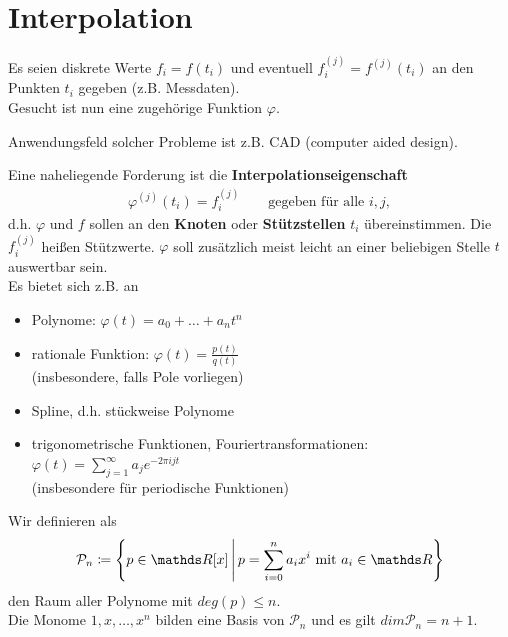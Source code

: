 %
%
%
%


\chapter{Interpolation}

Es seien diskrete Werte $f_i=f(t_i)$ und 
eventuell $f_i^{(j)} = f^{(j)}(t_i)$ 
an den Punkten $t_i$ gegeben (z.B. Messdaten).\\
Gesucht ist nun eine zugehörige Funktion $\varphi$.

Anwendungsfeld solcher Probleme ist z.B. CAD (computer aided
design).

Eine naheliegende Forderung ist die
\textbf{Interpolationseigenschaft}
\begin{gather*}
  \varphi^{(j)} (t_i) = f_i^{(j)}\qquad \text{gegeben für alle } i,j ,
\end{gather*}
d.h. $\varphi$ und $f$ sollen an den \textbf{Knoten} oder 
\textbf{Stützstellen} $t_i$ übereinstimmen.
Die $f_i^{(j)}$ heißen Stützwerte.
\label{im6.1}
$\varphi$ soll zusätzlich meist leicht an einer beliebigen Stelle $t$
auswertbar sein. \\
Es bietet sich z.B. an 
\begin{itemize}
\item Polynome: $\varphi(t) = a_0+\dots +a_n t^n$
\item rationale Funktion: $\varphi(t) = \frac{p(t)}{q(t)} $\\
  (insbesondere, falls Pole vorliegen)
\item Spline, d.h. stückweise Polynome
\item trigonometrische Funktionen, Fouriertransformationen:\\
  $ \varphi (t) = \sum_{j=1}^{\infty} a_je^{-2\pi ijt}$\\
  (insbesondere für periodische Funktionen)
\end{itemize}

Wir definieren als 
\begin{gather}
  \mathcal{P}_n \coloneqq \left\{ p \in \R[x]\,\middle\vert\,
    p= \sum_{i=0}^{n} a_ix^i \text{ mit } a_i\in\R \right\}
  \label{VI.1.1}
\end{gather}
den Raum aller Polynome mit $deg(p)\leq n$.\\
Die Monome $1,x, \dots , x^n$ bilden eine Basis von $\mathcal{P}_n$
und es gilt $dim\mathcal{P}_n = n+1$.

